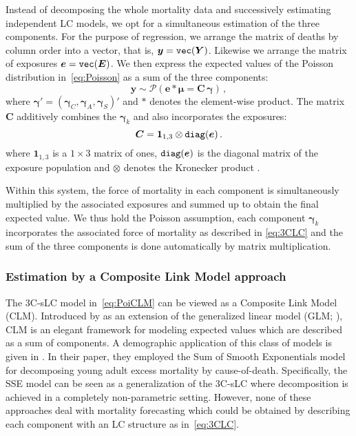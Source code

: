 \documentclass[Thesis]{subfiles}
\begin{document}
Instead of decomposing the whole mortality data and successively estimating independent LC models, we opt for a simultaneous estimation of the three components.
For the purpose of regression, we arrange the matrix of deaths by column order into a vector, that is, $\bm{y} = \verb"vec"(\bm{Y})$. Likewise we arrange the matrix of exposures $\bm{e} = \verb"vec"(\bm{E})$. We then express the expected values of the Poisson distribution in~\eqref{eq:Poisson} as a sum of the three components:
\begin{equation}\label{eq:PoiCLM}
\bm{y} \sim \mathcal{P}(\bm{e} * \bm{\mu} = \bm{C} \,\bm{\gamma})\, ,
\end{equation}
where $\bm{\gamma}' = (\bm{\gamma}_{C},\bm{\gamma}_{A},\bm{\gamma}_{S})'$ and $*$ denotes the element-wise product. The matrix $\bm{C}$ additively combines the $\bm{\gamma}_{k}$ and also incorporates the exposures:
\begin{equation}\label{eq:Cmat}
\bm{C} = \bm{1}_{1,3}\otimes \verb"diag"(\bm{e}) \, .
\end{equation}
where $\bm{1}_{1,3}$ is a $1\times 3$ matrix of ones, $\verb"diag"(\bm{e})$ is the diagonal matrix of the exposure population and $\otimes$ denotes the Kronecker product \citep[p.~333]{harville1997matrix}.

Within this system, the force of mortality in each component is simultaneously multiplied by the associated exposures and summed up to obtain the final expected value. We thus hold the Poisson assumption, each component $\bm{\gamma}_{k}$ incorporates the associated force of mortality as described in \eqref{eq:3CLC} and the sum of the three components is done automatically by matrix multiplication. 


\subsubsection{Estimation by a Composite Link Model approach}
The 3C-sLC model in~\eqref{eq:PoiCLM} can be viewed as a Composite Link Model (CLM). Introduced by \citet{thompson1981composite} as an extension of the generalized
linear model (GLM; \citealp{mccullagh1989glm}), CLM is an elegant framework for modeling expected values which are described as a sum of components. A demographic application of this class of models is given in \citet{remund2018young}. In their paper, they employed the Sum of Smooth Exponentials model \citep[SSE,][]{camarda2016sums} for decomposing young adult excess mortality by cause-of-death. Specifically, the SSE model can be seen as a generalization of the 3C-sLC where decomposition is achieved in a completely non-parametric setting. However, none of these approaches deal with mortality forecasting which could be obtained by describing each component with an LC structure as in~\eqref{eq:3CLC}.
\end{document}
